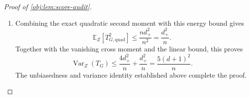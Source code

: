 \begin{proof}[Proof of \cref{obj:lem:score-audit}]
\begin{enumerate}
\item Combining the exact quadratic second moment with this energy bound gives
\[
\mathbb E_Z[T_{G,\mathrm{quad}}^2]
\le\frac{nd_+^2}{n^2}
=\frac{d_+^2}{n}.
\]
Together with the vanishing cross moment and the linear bound, this proves
\[
\operatorname{Var}_Z(T_G)
\le\frac{4d_+^2}{n}+\frac{d_+^2}{n}
=\frac{5(d+1)^2}{n}.
\]
The unbiasedness and variance identity established above complete the proof.
\end{enumerate}
\end{proof}
